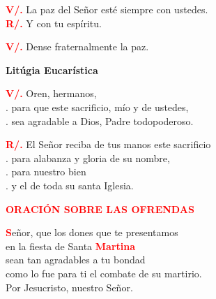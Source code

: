 \documentclass[12pt, letterpaper]{report}
\begin{document}
\noindent
\Large {\bfseries \textcolor{red}{V/.}} \hspace{0.5cm} La paz del Se\~nor est\'e siempre con ustedes. \\
\Large {\bfseries \textcolor{red}{R/.}} \hspace{0.5cm} Y con tu esp\'iritu. \newline

\noindent
\Large {\bfseries \textcolor{red}{V/.}} \hspace{0.5cm} Dense fraternalmente la paz. \newline

\newpage

\begin{center}
\Huge {\bfseries Lit\'ugia Eucar\'istica}
\end{center}

\noindent
\Large {\bfseries \textcolor{red}{V/.}} \hspace{0.5cm} Oren, hermanos, \\
. \hspace{1.5cm} para que este sacrificio, m\'io y de ustedes, \\
. \hspace{1.5cm} sea agradable a Dios, Padre todopoderoso. \newline

\noindent
\Large {\bfseries \textcolor{red}{R/.}} \hspace{0.5cm} El Se\~nor reciba de tus manos este sacrificio \\
. \hspace{1.5cm} para alabanza y gloria de su nombre, \\
. \hspace{1.5cm} para nuestro bien \\
. \hspace{1.5cm} y el de toda su santa Iglesia. \newline

\Large {\bfseries \textcolor{red}{ORACI\'ON SOBRE LAS OFRENDAS}}

\lettrine[lines=1]{\bfseries \textcolor{red}{S}}{}\Large e\~nor, que los dones que te presentamos \\
en la fiesta de Santa {\bfseries \textcolor{red}{Martina}} \\
sean tan agradables a tu bondad \\
como lo fue para ti el combate de su martirio. \\
Por Jesucristo, nuestro Se\~nor. \newline
\end{document}
